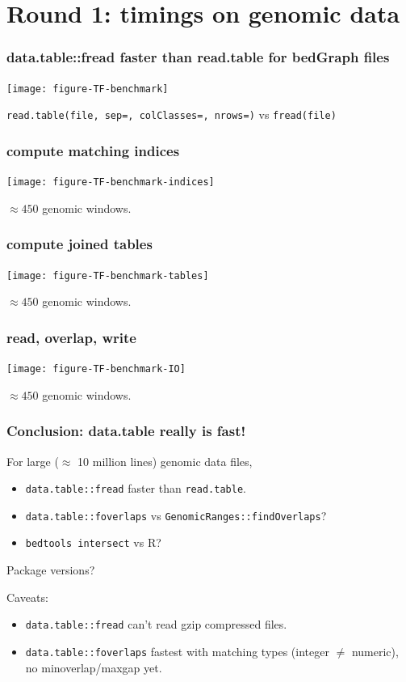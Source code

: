 \documentclass{beamer}
\begin{document}
\section{Round 1: timings on genomic data}

\begin{frame}
  \frametitle{data.table::fread faster than read.table for bedGraph
    files}
  \texttt{[image: figure-TF-benchmark]}

  \texttt{read.table(file, sep=, colClasses=, nrows=)} vs
  \texttt{fread(file)}
\end{frame}

\begin{frame}
  \frametitle{compute matching indices}
  \texttt{[image: figure-TF-benchmark-indices]}

  $\approx 450$ genomic windows.
\end{frame}

\begin{frame}
  \frametitle{compute joined tables}
  \texttt{[image: figure-TF-benchmark-tables]}

  $\approx 450$ genomic windows.
\end{frame}

\begin{frame}
  \frametitle{read, overlap, write}
  \texttt{[image: figure-TF-benchmark-IO]}

  $\approx 450$ genomic windows.
\end{frame}




\begin{frame}
  \frametitle{Conclusion: data.table really is fast!}
  For large ($\approx$ 10 million lines) genomic data files,
  \begin{itemize}
  \item \texttt{data.table::fread} faster than \texttt{read.table}.
  \item \texttt{data.table::foverlaps} vs
    \texttt{GenomicRanges::findOverlaps}?
  \item \texttt{bedtools intersect} vs R?
  \end{itemize}

  Package versions?

  Caveats:
  \begin{itemize}
  \item \texttt{data.table::fread} can't read gzip compressed files.
  \item \texttt{data.table::foverlaps} fastest with matching types
    (integer $\neq$ numeric), no minoverlap/maxgap yet.
  \end{itemize}
\end{frame}
\end{document}
